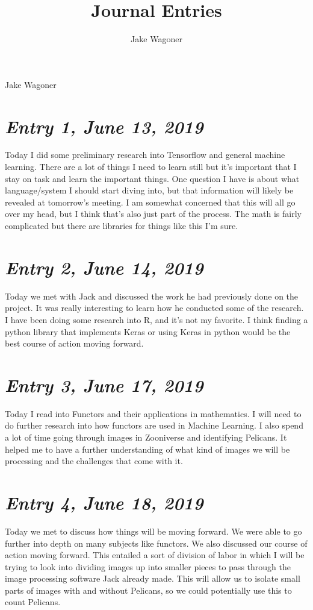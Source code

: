\documentclass{article}
\author{Jake Wagoner}
\title{Journal Entries}
\begin{document}
{\Large Jake Wagoner}\\

\section{\Large \itshape  Entry 1, June 13, 2019}
	Today I did some preliminary research into Tensorflow and general machine learning.
There are a lot of things I need to learn still but it's important that I stay on task and learn the important things.
One question I have is about what language/system I should start diving into, but that information will likely be revealed at tomorrow's meeting.
I am somewhat concerned that this will all go over my head, but I think that's also just part of the process. The math is fairly complicated but there are libraries for things like this I'm sure.


\section{\Large \itshape Entry 2, June 14, 2019}
	Today we met with Jack and discussed the work he had previously done on the project.
It was really interesting to learn how he conducted some of the research. I have been doing some research into R, and it's not my favorite.
I think finding a python library that implements Keras or using Keras in python would be the best course of action moving forward.

\section{\Large \itshape Entry 3, June 17, 2019}
	Today I read into Functors and their applications in mathematics. I will need to do further research into how functors are used in Machine Learning.
I also spend a lot of time going through images in Zooniverse and identifying Pelicans. It helped me to have a further understanding of what kind of images we will be processing and the challenges that come with it.

\section{\Large \itshape Entry 4, June 18, 2019}
	Today we met to discuss how things will be moving forward. We were able to go further into depth on many subjects like functors. We also discussed our course of action moving forward.
This entailed a sort of division of labor in which I will be trying to look into dividing images up into smaller pieces to pass through the image processing software Jack already made.
This will allow us to isolate small parts of images with and without Pelicans, so we could potentially use this to count Pelicans.
\end{document}
